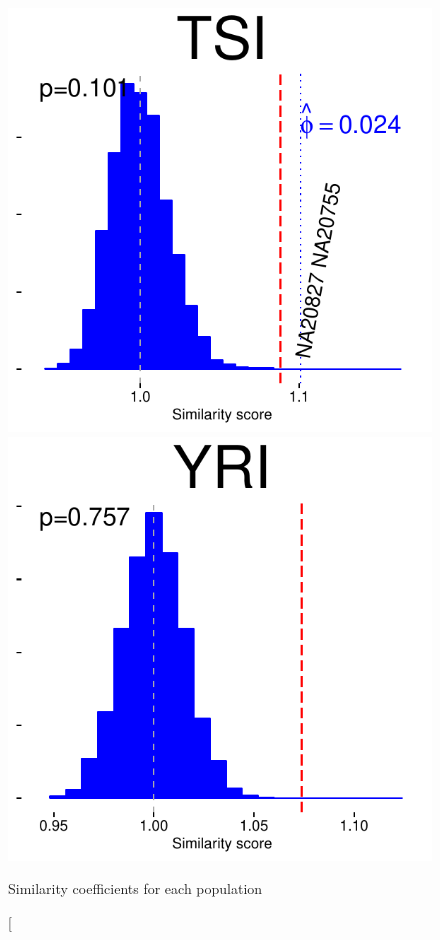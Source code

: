 \begin{figure}
\includegraphics[width=0.12\paperwidth]{figures/PostFilter/TSIdiploid}\includegraphics[width=0.12\paperwidth]{figures/PostFilter/YRIdiploid}\caption[Similarity coefficients for each population

\end{figure}
